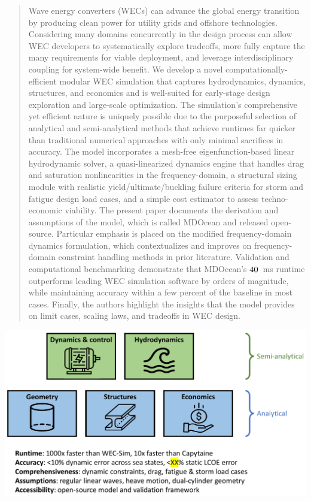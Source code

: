 \documentclass[preprint,12pt]{elsarticle}
\begin{document}
\begin{frontmatter}
\begin{abstract}
Wave energy converters (WECs) can advance the global energy transition by producing clean power for utility grids and offshore technologies.
Considering many domains concurrently in the design process can allow WEC developers to systematically explore tradeoffs, more fully capture the many requirements for viable deployment, and leverage interdisciplinary coupling for system-wide benefit.
We develop a novel computationally-efficient modular WEC simulation that captures hydrodynamics, dynamics, structures, and economics and is well-suited for early-stage design exploration and large-scale optimization.
The simulation's comprehensive yet efficient nature is uniquely possible due to the purposeful selection of analytical and semi-analytical methods that achieve runtimes far quicker than traditional numerical approaches with only minimal sacrifices in accuracy.
The model incorporates a mesh-free eigenfunction-based linear hydrodynamic solver, a quasi-linearized dynamics engine that handles drag and saturation nonlinearities in the frequency-domain, a structural sizing module with realistic yield/ultimate/buckling failure criteria for storm and fatigue design load cases, and a simple cost estimator to assess techno-economic viability.
The present paper documents the derivation and assumptions of the model, which is called MDOcean and released open-source.
Particular emphasis is placed on the modified frequency-domain dynamics formulation, which contextualizes and improves on frequency-domain constraint handling methods in prior literature.
Validation and computational benchmarking demonstrate that MDOcean's $40$~ms runtime outperforms leading WEC simulation software by orders of magnitude, while maintaining accuracy within a few percent of the baseline in most cases. 
Finally, the authors highlight the insights that the model provides on limit cases, scaling laws, and tradeoffs in WEC design.


\end{abstract}

\begin{graphicalabstract}
\centering
\includegraphics[width=\linewidth]{figs/graphical_abstract.pdf}
\end{graphicalabstract}


\end{frontmatter}
\end{document}
